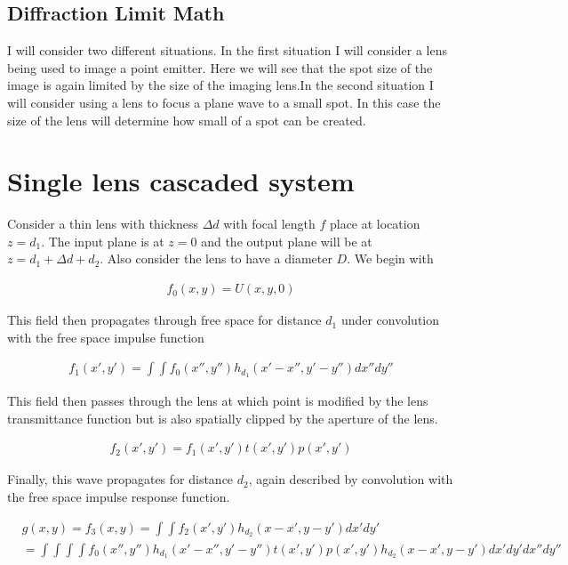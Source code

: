 \documentclass[12pt]{article}
\begin{document}
\subsection{Diffraction Limit Math}

I will consider two different situations. In the first situation I will consider a lens being used to image a point emitter. Here we will see that the spot size of the image is again limited by the size of the imaging lens.In the second situation I will consider using a lens to focus a plane wave to a small spot. In this case the size of the lens will determine how small of a spot can be created. 


\section{Single lens cascaded system}

Consider a thin lens with thickness $\Delta d$ with focal length $f$ place at location $z=d_1$. The input plane is at $z=0$ and the output plane will be at $z = d_1+\Delta d + d_2$. Also consider the lens to have a diameter $D$.
We begin with 

\begin{align}
f_0(x,y) = U(x,y,0)
\end{align}

This field then propagates through free space for distance $d_1$ under convolution with the free space impulse function

\begin{align}
f_1(x',y') = \int \int f_0(x'',y'') h_{d_1}(x'-x'',y'-y'') dx''dy''
\end{align}

This field then passes through the lens at which point is modified by the lens transmittance function but is also spatially clipped by the aperture of the lens.

\begin{align}
f_2(x',y') = f_1(x',y')t(x',y')p(x',y')
\end{align}

Finally, this wave propagates for distance $d_2$, again described by convolution with the free space impulse response function.

\begin{align}
&g(x,y) = f_3(x,y) = \int \int f_2(x',y') h_{d_2}(x-x',y-y') dx'dy'\\
&= \int\int\int\int f_0(x'',y'') h_{d_1}(x'-x'',y'-y'') t(x',y')p(x',y') h_{d_2}(x-x',y-y') dx'dy'dx''dy''
\end{align}
\end{document}

